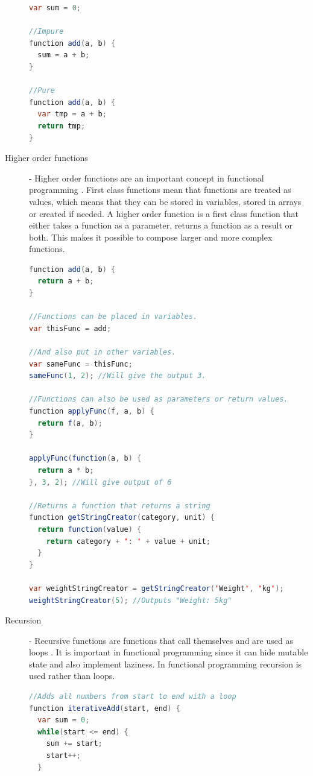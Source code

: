 \documentclass {article}
\begin{document}
\begin{description}
\begin{lstlisting}[language=Java]
var sum = 0;

//Impure
function add(a, b) {
  sum = a + b;
}

//Pure
function add(a, b) {
  var tmp = a + b;
  return tmp;
}
\end{lstlisting}

\item [Higher order functions] - Higher order functions are an important concept in functional programming \cite{fogus}. First class functions mean that functions are treated as values, which means that they can be stored in variables, stored in arrays or created if needed. A higher order function is a first class function that either takes a function as a parameter, returns a function as a result or both. This makes it possible to compose larger and more complex functions.

\begin{lstlisting}[language=Java, breaklines=true]
function add(a, b) {
  return a + b;
}

//Functions can be placed in variables.
var thisFunc = add;

//And also put in other variables.
var sameFunc = thisFunc;
sameFunc(1, 2); //Will give the output 3.

//Functions can also be used as parameters or return values.
function applyFunc(f, a, b) {
  return f(a, b);
}

applyFunc(function(a, b) {
  return a * b;
}, 3, 2); //Will give output of 6

//Returns a function that returns a string
function getStringCreator(category, unit) {
  return function(value) {
    return category + ': ' + value + unit;
  }
}

var weightStringCreator = getStringCreator('Weight', 'kg');
weightStringCreator(5); //Outputs "Weight: 5kg"
\end{lstlisting}

\item [Recursion] - Recursive functions are functions that call themselves and are used as loops \cite{fogus}. It is important in functional programming since it can hide mutable state and also implement laziness. In functional programming recursion is used rather than loops.

\begin{lstlisting}[language=Java]
//Adds all numbers from start to end with a loop
function iterativeAdd(start, end) {
  var sum = 0;
  while(start <= end) {
    sum += start;
    start++;
  }


\end{lstlisting}
\end{description}
\end{document}
